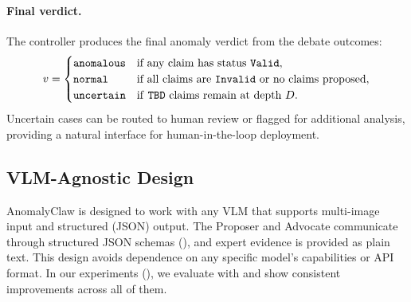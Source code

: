 \paragraph{Final verdict.}
The controller produces the final anomaly verdict from the debate outcomes:
\begin{equation}
    v = \begin{cases}
        \texttt{anomalous} & \text{if any claim has status \texttt{Valid}}, \\
        \texttt{normal} & \text{if all claims are \texttt{Invalid} or no claims proposed}, \\
        \texttt{uncertain} & \text{if \texttt{TBD} claims remain at depth } D.
    \end{cases}
    \label{eq:verdict}
\end{equation}
Uncertain cases can be routed to human review or flagged for additional analysis, providing a natural interface for human-in-the-loop deployment.

\subsection{VLM-Agnostic Design}
\label{sec:vlm_agnostic}

AnomalyClaw is designed to work with any VLM that supports multi-image input and structured (JSON) output.
The Proposer and Advocate communicate through structured JSON schemas (), and expert evidence is provided as plain text.
This design avoids dependence on any specific model's capabilities or API format.
In our experiments (), we evaluate with  and show consistent improvements across all of them.
